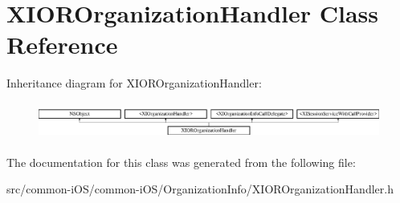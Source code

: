 \hypertarget{interface_x_i_o_r_organization_handler}{}\section{X\+I\+O\+R\+Organization\+Handler Class Reference}
\label{interface_x_i_o_r_organization_handler}
Inheritance diagram for X\+I\+O\+R\+Organization\+Handler\+:\begin{figure}[H]
\begin{center}
\leavevmode
\includegraphics[height=1.222707cm]{interface_x_i_o_r_organization_handler}
\end{center}
\end{figure}


The documentation for this class was generated from the following file\+:\begin{DoxyCompactItemize}
\item 
src/common-\/i\+O\+S/common-\/i\+O\+S/\+Organization\+Info/X\+I\+O\+R\+Organization\+Handler.\+h\end{DoxyCompactItemize}
